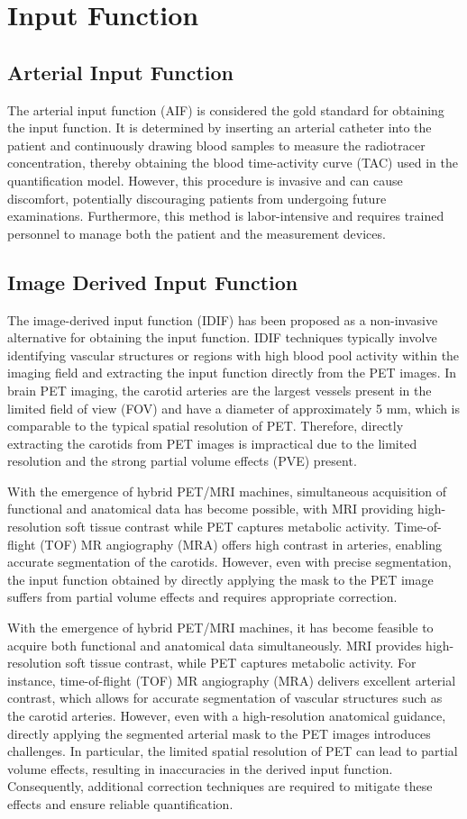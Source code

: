 \section{Input Function}
\subsection{Arterial Input Function}
The arterial input function (AIF) is considered the gold standard for obtaining the input function.
It is determined by inserting an arterial catheter into the patient and continuously drawing blood samples to measure the radiotracer concentration, thereby obtaining the blood time-activity curve (TAC) used in the quantification model.
However, this procedure is invasive and can cause discomfort, potentially discouraging patients from undergoing future examinations.
Furthermore, this method is labor-intensive and requires trained personnel to manage both the patient and the measurement devices.

\subsection{Image Derived Input Function}
The image-derived input function (IDIF) has been proposed as a non-invasive alternative for obtaining the input function.
IDIF techniques typically involve identifying vascular structures or regions with high blood pool activity within the imaging field and extracting the input function directly from the PET images.
In brain PET imaging, the carotid arteries are the largest vessels present in the limited field of view (FOV) and have a diameter of approximately 5 mm, which is comparable to the typical spatial resolution of PET.
Therefore, directly extracting the carotids from PET images is impractical due to the limited resolution and the strong partial volume effects (PVE) present.

With the emergence of hybrid PET/MRI machines, simultaneous acquisition of functional and anatomical data has become possible, with MRI providing high-resolution soft tissue contrast while PET captures metabolic activity.
Time-of-flight (TOF) MR angiography (MRA) offers high contrast in arteries, enabling accurate segmentation of the carotids.
However, even with precise segmentation, the input function obtained by directly applying the mask to the PET image suffers from partial volume effects and requires appropriate correction.

With the emergence of hybrid PET/MRI machines, it has become feasible to acquire both functional and anatomical data simultaneously.
MRI provides high-resolution soft tissue contrast, while PET captures metabolic activity.
For instance, time-of-flight (TOF) MR angiography (MRA) delivers excellent arterial contrast, which allows for accurate segmentation of vascular structures such as the carotid arteries.
However, even with a high-resolution anatomical guidance, directly applying the segmented arterial mask to the PET images introduces challenges.
In particular, the limited spatial resolution of PET can lead to partial volume effects, resulting in inaccuracies in the derived input function.
Consequently, additional correction techniques are required to mitigate these effects and ensure reliable quantification.


